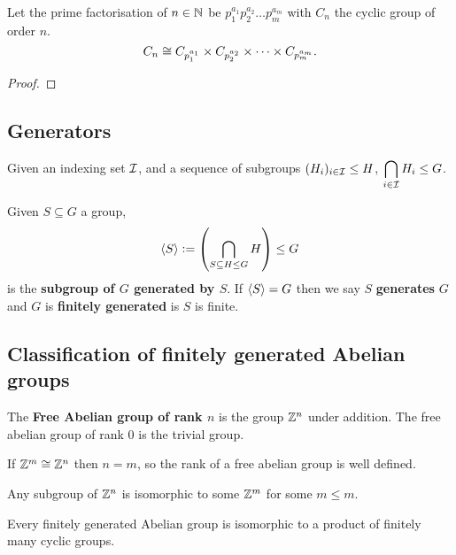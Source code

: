\documentclass[../Year2.tex]{subfiles}
\begin{document}
\begin{theorem}
    Let the prime factorisation of $n\in\mathbb{N}$ be $p_1^{a_1}p_2^{a_2}\ldots p_m^{a_m}$ with $C_n$ the cyclic group of order $n$. \[
        C_n\cong C_{p_1^{a_1}}\times C_{p_2^{a_2}} \times \cdots \times C_{p_m^{a_m}}
    \text{\textcolor{black}{.}}
    \]
\vspace{-20pt}
    \begin{proof}
        
    \end{proof}
\end{theorem}

\subsection{Generators}

\begin{lemma}
    Given an indexing set $\mathcal{I}$, and a sequence of subgroups $(H_i)_{i\in\mathcal{I}}\leq H$, $\displaystyle \bigcap_{i\in\mathcal{I}}H_i\leq G$.
\end{lemma}

\begin{definition}
    Given $S\subseteq G$ a group,  \[
        \abr{S}:=\br{\bigcap_{S\subseteq H\leq G}H} \leq G
    \] is the \textbf{subgroup of $G$ generated by $S$}. If $\left\langle S \right\rangle=G$ then we say $S$ \textbf{generates} $G$ and $G$ is \textbf{finitely generated} is $S$ is finite.
\end{definition}

\subsection{Classification of finitely generated Abelian groups}
\begin{definition}
    The \textbf{Free Abelian group of rank $n$} is the group $\mathbb{Z}^n$ under addition. The free abelian group of rank 0 is the trivial group.
\end{definition}

\begin{lemma}
    If $\mathbb{Z}^m\cong\mathbb{Z}^n$ then $n=m$, so the rank of a free abelian group is well defined.
\end{lemma}

\begin{lemma}
    Any subgroup of $\mathbb{Z}^n$ is isomorphic to some $\mathbb{Z}^m$ for some $m\leq m$.
\end{lemma}

\begin{theorem}
    Every finitely generated Abelian group is isomorphic to a product of finitely many cyclic groups.
\end{theorem}
\end{document}
